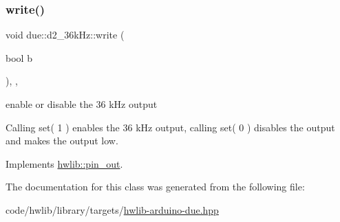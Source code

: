 \subsubsection{\texorpdfstring{write()}{write()}}
{\footnotesize\ttfamily void due\+::d2\+\_\+36k\+Hz\+::write (\begin{DoxyParamCaption}\item[{bool}]{b }\end{DoxyParamCaption})\hspace{0.3cm}{\ttfamily [inline]}, {\ttfamily [override]}, {\ttfamily [virtual]}}



enable or disable the 36 k\+Hz output 

Calling set( 1 ) enables the 36 k\+Hz output, calling set( 0 ) disables the output and makes the output low. 

Implements \hyperlink{classhwlib_1_1pin__out_a8d260a70e503dcfb81987c408e170300}{hwlib\+::pin\+\_\+out}.



The documentation for this class was generated from the following file\+:\begin{DoxyCompactItemize}
\item 
code/hwlib/library/targets/\hyperlink{hwlib-arduino-due_8hpp}{hwlib-\/arduino-\/due.\+hpp}\end{DoxyCompactItemize}
